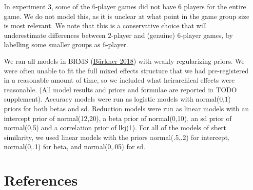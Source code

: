 \documentclass[
  english,
  a4paper,
]{article}
\begin{document}
In experiment 3, some of the 6-player games did not have 6 players for the entire game. We do not model this, as it is unclear at what point in the game group size is most relevant. We note that this is a conservative choice that will underestimate differences between 2-player and (genuine) 6-player games, by labelling some smaller groups as 6-player.

We ran all models in BRMS (\protect\hyperlink{ref-burkner2018}{Bürkner 2018}) with weakly regularizing priors. We were often unable to fit the full mixed effects structure that we had pre-registered in a reasonable amount of time, so we included what heirarchical effects were reasonable. (All model results and priors and formulae are reported in TODO supplement). Accuracy models were run as logistic models with normal(0,1) priors for both betas and sd. Reduction models were run as linear models with an intercept prior of normal(12,20), a beta prior of normal(0,10), an sd prior of normal(0,5) and a correlation prior of lkj(1). For all of the models of sbert similarity, we used linear models with the priors normal(.5,.2) for intercept, normal(0,.1) for beta, and normal(0,.05) for sd.

\hypertarget{references}{%
\section{References}\label{references}}

\setlength{\parindent}{-0.1in} 
\setlength{\leftskip}{0.125in}

\noindent
\end{document}
